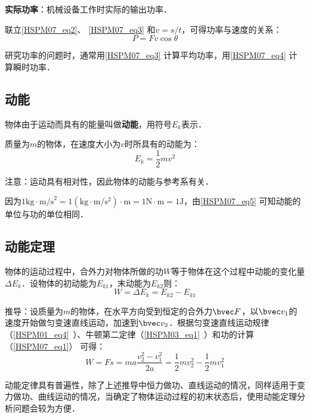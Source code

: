 \textbf{实际功率}：机械设备工作时实际的输出功率．

联立\autoref{HSPM07_eq2}、 \autoref{HSPM07_eq3} 和$v=s/t$，可得功率与速度的关系：
\begin{equation}\label{HSPM07_eq4}
P=Fv\cos \theta
\end{equation}

研究功率的问题时，通常用\autoref{HSPM07_eq3} 计算平均功率，用\autoref{HSPM07_eq4} 计算瞬时功率．

\subsection{动能}

物体由于运动而具有的能量叫做\textbf{动能}，用符号$E_k$表示．

质量为$m$的物体，在速度大小为$v$时所具有的动能为：
\begin{equation}\label{HSPM07_eq5}
E_k=\frac12mv^2
\end{equation}

注意：运动具有相对性，因此物体的动能与参考系有关．

因为$\mathrm{1kg\cdot {m/s}^2=1(kg\cdot m/s^2)\cdot m=1N\cdot m=1J}$，由\autoref{HSPM07_eq5} 可知动能的单位与功的单位相同．

\subsection{动能定理}

物体的运动过程中，合外力对物体所做的功$W$等于物体在这个过程中动能的变化量$\Delta E_k$．设物体的初动能为$E_{k1}$，末动能为$E_{k2}$则：
\begin{equation}\label{HSPM07_eq6}
W=\Delta E_k =E_{k2}-E_{k1}
\end{equation}

推导：设质量为$m$的物体，在水平方向受到恒定的合外力$\bvec F$，以$\bvec v_1$的速度开始做匀变速直线运动，加速到$\bvec v_2$．根据匀变速直线运动规律（\autoref{HSPM01_eq4}~）、牛顿第二定律（\autoref{HSPM03_eq1}~）和功的计算（\autoref{HSPM07_eq1}） 可得：
\begin{equation}
W=Fs=ma\frac{v_2^2-v_1^2}{2a}=\frac12mv_2^2-\frac12mv_1^2
\end{equation}

动能定律具有普遍性，除了上述推导中恒力做功、直线运动的情况，同样适用于变力做功、曲线运动的情况，当确定了物体运动过程的初末状态后，使用动能定理分析问题会较为方便．
